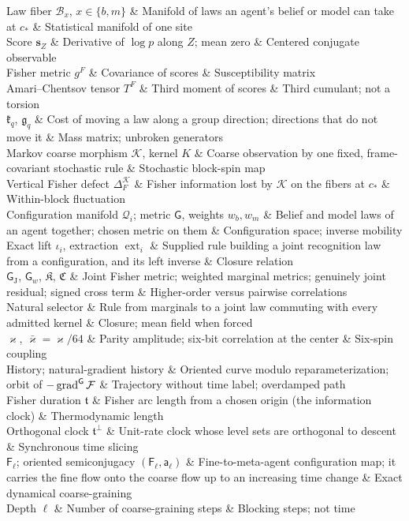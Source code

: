 \begin{decoder}
Law fiber $\mathcal B_x$, $x\in\{b,m\}$ & Manifold of laws an agent's belief or model can take at $c_*$ & Statistical manifold of one site\\
Score $\mathbf s_Z$ & Derivative of $\log p$ along $Z$; mean zero & Centered conjugate observable\\
Fisher metric $g^F$ & Covariance of scores & Susceptibility matrix\\
Amari--Chentsov tensor $T^F$ & Third moment of scores & Third cumulant; not a torsion\\
$\mathfrak k_q$, $\mathfrak g_q$ & Cost of moving a law along a group direction; directions that do not move it & Mass matrix; unbroken generators\\
Markov coarse morphism $\mathscr K$, kernel $K$ & Coarse observation by one fixed, frame-covariant stochastic rule & Stochastic block-spin map\\
Vertical Fisher defect $\Delta_F^{\mathscr K}$ & Fisher information lost by $\mathscr K$ on the fibers at $c_*$ & Within-block fluctuation\\
Configuration manifold $\mathcal Q_i$; metric $\mathsf G$, weights $w_b,w_m$ & Belief and model laws of an agent together; chosen metric on them & Configuration space; inverse mobility\\
Exact lift $\iota_i$, extraction $\operatorname{ext}_i$ & Supplied rule building a joint recognition law from a configuration, and its left inverse & Closure relation\\
$\mathsf G_{\mathrm J}$, $\mathsf G_w$, $\mathfrak K$, $\mathfrak C$ & Joint Fisher metric; weighted marginal metrics; genuinely joint residual; signed cross term & Higher-order versus pairwise correlations\\
Natural selector & Rule from marginals to a joint law commuting with every admitted kernel & Closure; mean field when forced\\
$\varkappa$, $\bar\varkappa=\varkappa/64$ & Parity amplitude; six-bit correlation at the center & Six-spin coupling\\
History; natural-gradient history & Oriented curve modulo reparameterization; orbit of $-\operatorname{grad}^{\mathsf G}\mathcal F$ & Trajectory without time label; overdamped path\\
Fisher duration $\mathfrak t$ & Fisher arc length from a chosen origin (the information clock) & Thermodynamic length\\
Orthogonal clock $\mathfrak t^\perp$ & Unit-rate clock whose level sets are orthogonal to descent & Synchronous time slicing\\
$\mathsf F_\ell$; oriented semiconjugacy $(\mathsf F_\ell,\mathsf a_\ell)$ & Fine-to-meta-agent configuration map; it carries the fine flow onto the coarse flow up to an increasing time change & Exact dynamical coarse-graining\\
Depth $\ell$ & Number of coarse-graining steps & Blocking steps; not time\\
\end{decoder}

